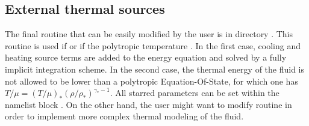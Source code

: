 \subsection{External thermal sources}

The final routine that can be easily modified by the user is
 in directory . This routine is used if
 or if the polytropic temperature
. In the first case, cooling and heating source
terms are added to the energy equation and solved by a fully implicit
integration scheme. In the second case, the thermal energy of the fluid is not
allowed to be lower than a polytropic Equation-Of-State, for which one has $ T
/ \mu = {(T / \mu)}_{*} {(\rho / \rho_{*})}^{\gamma_{*}-1} $.  All starred
parameters can be set within the namelist block .
On the other hand, the user might want to modify routine
 in order to implement more complex thermal modeling of
the fluid.
